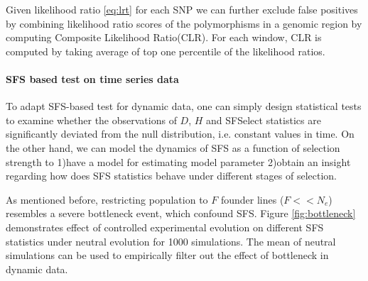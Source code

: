 \documentclass[11pt]{article}
\begin{document}
Given likelihood ratio \eqref{eq:lrt} for each SNP we can further exclude false 
positives by combining likelihood ratio scores of the polymorphisms in a 
genomic region by computing Composite 
Likelihood 
Ratio(CLR)\cite{nielsen2005genomic,williamson2007localizing,vitti2013detecting}.
For each window, CLR is computed by taking average of top one percentile of the 
likelihood ratios.

\paragraph{SFS based test on time series data}\label{sec:sfs-ts}
To adapt SFS-based test for dynamic data, one can simply design statistical 
tests to examine whether the 
observations of $D$, $H$ and SFSelect statistics are 
significantly deviated 
from the null distribution, i.e. constant values in time.
On the other hand, we can model the dynamics of SFS as a 
function of selection 
strength to 1)have a model for estimating model parameter 2)obtain an insight 
regarding how does SFS statistics behave under different 
stages of selection.

As mentioned before, restricting population to $F$ founder lines ($F<<N_e$) 
resembles a severe bottleneck event, which confound SFS. Figure 
\ref{fig:bottleneck} demonstrates effect of controlled experimental evolution 
on different SFS statistics under neutral evolution for 1000 simulations. The 
mean of 
neutral simulations can be used to empirically filter out the effect of 
bottleneck in dynamic data. 
\end{document}
